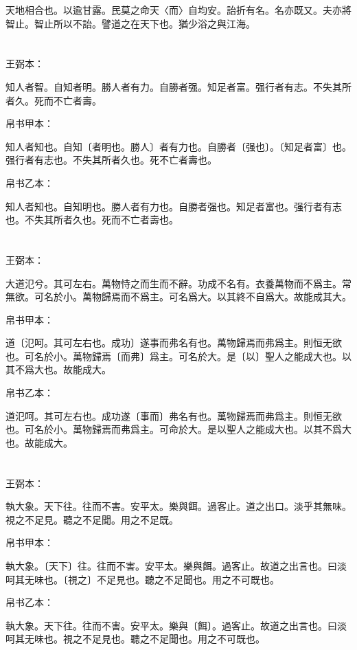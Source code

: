 \documentclass[a5paper]{ctexbook}
\begin{document}
    天地相合也。以逾甘露。民莫之命天〈而〉自均安。詒折有名。名亦既又。夫亦將智止。智止所以不詒。譬道之在天下也。猶少浴之與江海。

    \chapter{}
    王弼本：

    知人者智。自知者明。勝人者有力。自勝者强。知足者富。强行者有志。不失其所者久。死而不亡者壽。

    
    帛书甲本：

    知人者知也。自知〔者明也。勝人〕者有力也。自勝者〔强也〕。〔知足者富〕也。强行者有志也。不失其所者久也。死不亡者壽也。

    帛书乙本：

    知人者知也。自知明也。勝人者有力也。自勝者强也。知足者富也。强行者有志也。不失其所者久也。死而不亡者壽也。

    \chapter{}
    王弼本：

    大道氾兮。其可左右。萬物恃之而生而不辭。功成不名有。衣養萬物而不爲主。常無欲。可名於小。萬物歸焉而不爲主。可名爲大。以其終不自爲大。故能成其大。

    
    帛书甲本：

    道〔氾呵。其可左右也。成功〕遂事而弗名有也。萬物歸焉而弗爲主。則恒无欲也。可名於小。萬物歸焉〔而弗〕爲主。可名於大。是〔以〕聖人之能成大也。以其不爲大也。故能成大。

    帛书乙本：

    道氾呵。其可左右也。成功遂〔事而〕弗名有也。萬物歸焉而弗爲主。則恒无欲也。可名於小。萬物歸焉而弗爲主。可命於大。是以聖人之能成大也。以其不爲大也。故能成大。

    \chapter{}
    王弼本：

    執大象。天下往。往而不害。安平太。樂與餌。過客止。道之出口。淡乎其無味。視之不足見。聽之不足聞。用之不足既。

    
    帛书甲本：

    執大象。〔天下〕往。往而不害。安平太。樂與餌。過客止。故道之出言也。曰淡呵其无味也。〔視之〕不足見也。聽之不足聞也。用之不可既也。

    帛书乙本：

    執大象。天下往。往而不害。安平太。樂與〔餌〕。過客止。故道之出言也。曰淡呵其无味也。視之不足見也。聽之不足聞也。用之不可既也。
\end{document}
